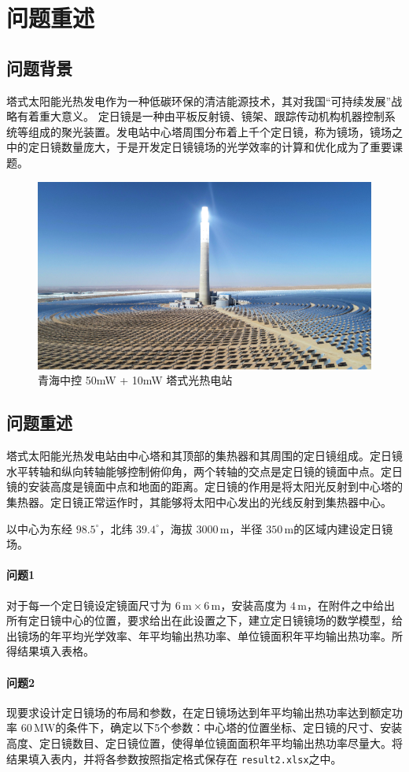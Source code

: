 \section{问题重述}
\subsection{问题背景}
塔式太阳能光热发电作为一种低碳环保的清洁能源技术，其对我国``可持续发展''战略有着重大意义。
定日镜是一种由平板反射镜、镜架、跟踪传动机构机器控制系统等组成的聚光装置。发电站中心塔周围分布着上千个定日镜，称为镜场，镜场之中的定日镜数量庞大，于是开发定日镜镜场的光学效率的计算和优化成为了重要课题。

\begin{figure}[H]
\centering
\includegraphics[scale = 0.07]{tower.jpg}
\caption{\kaishu 青海中控 {\rm 50mW + 10mW} 塔式光热电站}
\end{figure}
\subsection{问题重述}
塔式太阳能光热发电站由中心塔和其顶部的集热器和其周围的定日镜组成。定日镜水平转轴和纵向转轴能够控制俯仰角，两个转轴的交点是定日镜的镜面中点。定日镜的安装高度是镜面中点和地面的距离。定日镜的作用是将太阳光反射到中心塔的集热器。定日镜正常运作时，其能够将太阳中心发出的光线反射到集热器中心。

以中心为东经 \(98.5^\circ\)，北纬 \(39.4 ^\circ\)，海拔 \(3000\, \mathrm{m}\)，半径 \(350 \, \mathrm{m}\)的区域内建设定日镜场。
\paragraph{问题1}
对于每一个定日镜设定镜面尺寸为 \(6 \,\mathrm{m} \times 6 \, \mathrm{m}\)，安装高度为 \(4 \,\mathrm{m}\)，在附件之中给出所有定日镜中心的位置，要求给出在此设置之下，建立定日镜镜场的数学模型，给出镜场的年平均光学效率、年平均输出热功率、单位镜面积年平均输出热功率。所得结果填入表格。
\paragraph{问题2}
现要求设计定日镜场的布局和参数，在定日镜场达到年平均输出热功率达到额定功率 \(60 \, \mathrm{MW}\)的条件下，确定以下5个参数：中心塔的位置坐标、定日镜的尺寸、安装高度、定日镜数目、定日镜位置，使得单位镜面面积年平均输出热功率尽量大。将结果填入表内，并将各参数按照指定格式保存在 \texttt{result2.xlsx}之中。
